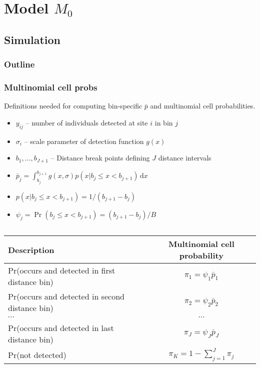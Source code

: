 \documentclass[color=usenames,dvipsnames]{beamer}\usepackage[]{graphicx}\usepackage[]{color}
\begin{document}
\section{Model $M_0$}






\subsection{Simulation}

\begin{frame}
  \frametitle{Outline}
  \Large
  \tableofcontents[currentsection]
\end{frame}



\begin{frame}
  \frametitle{Multinomial cell probs}
  \small
  Definitions needed for computing \alert{bin-specific} $\bar{p}$ and
  multinomial cell probabilities. 
  \begin{itemize}
  \small
    \setlength\itemsep{1pt}
    \item $y_{ij}$ -- number of individuals detected at site $i$ in bin $j$
    \item $\sigma_i$ -- scale parameter of detection function $g(x)$
    \item $b_1, \dots, b_{J+1}$ -- Distance break points defining $J$ distance intervals
    \item $\bar{p}_j = \int_{b_j}^{b_{j+1}} g(x,\sigma)p(x|b_j\le x<b_{j+1})\, \mathrm{d}x$
    \item $p(x|b_j\le x<b_{j+1}) = 1/(b_{j+1}-b_j)$
    \item $\psi_j=\Pr(b_j\le x<b_{j+1})=(b_{j+1}-b_j)/B$ %
  \end{itemize}
  \pause \vfill
  \footnotesize
  \begin{columns}
    \column{0.9\paperwidth}
    \begin{tabular}{lc}
      \hline
      \centering
      Description                       & Multinomial cell probability \\
      \hline
      Pr(occurs and detected in first distance bin)  & $\pi_1 = \psi_1\bar{p}_1$   \\
      Pr(occurs and detected in second distance bin)  & $\pi_2 = \psi_2\bar{p}_2$   \\
      {\centering $\cdots$}             & $\cdots$                     \\
      Pr(occurs and detected in last distance bin)  & $\pi_J = \psi_J\bar{p}_J$   \\
      Pr(not detected)                  & $\pi_{K} = 1-\sum_{j=1}^J \pi_j$          \\
      \hline
    \end{tabular}
  \end{columns}
\end{frame}
\end{document}
